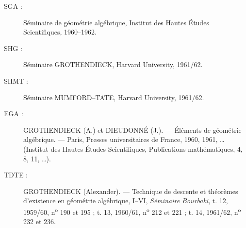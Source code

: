 \begin{description}
\item[SGA :] Séminaire de géométrie algébrique, Institut des Hautes Études
Scientifiques, 1960--1962.

\item[SHG :] Séminaire GROTHENDIECK, Harvard University, 1961/62.

\item[SHMT :] Séminaire MUMFORD--TATE, Harvard University, 1961/62.

\item[EGA :] GROTHENDIECK (A.) et DIEUDONNÉ (J.). --- Éléments de géométrie
algébrique. --- Paris, Presses universitaires de France, 1960, 1961, …
(Institut des Hautes Études Scientifiques, Publications mathématiques, 4, 8,
11, …).

\item[TDTE :] GROTHENDIECK (Alexander). --- Technique de descente et théorèmes
d'existence en géométrie algébrique, I--VI, \emph{Séminaire Bourbaki}, t. 12,
1959/60, n\textsuperscript{o} 190 et 195 ; t. 13, 1960/61,
n\textsuperscript{o} 212 et 221 ; t. 14, 1961/62, n\textsuperscript{o} 232 et
236.
\end{description}

\par\smallskip
\begingroup\footnotesize
\endgroup
